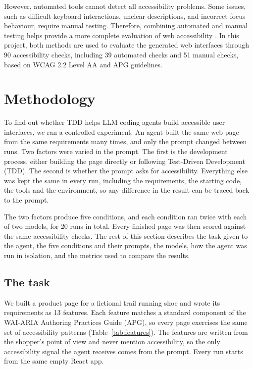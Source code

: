 \documentclass[conference]{IEEEtran}
\begin{document}
However, automated tools cannot detect all accessibility problems. Some issues, such as difficult keyboard interactions, unclear descriptions, and incorrect focus behaviour, require manual testing. Therefore, combining automated and manual testing helps provide a more complete evaluation of web accessibility \cite{playwright2026}. In this project, both methods are used to evaluate the generated web interfaces through 90 accessibility checks, including 39 automated checks and 51 manual checks, based on WCAG 2.2 Level AA and APG guidelines.

\section{Methodology}

To find out whether TDD helps LLM coding agents build accessible user interfaces, we ran a controlled experiment. An agent built the same web page from the same requirements many times, and only the prompt changed between runs. Two factors were varied in the prompt. The first is the development process, either building the page directly or following Test-Driven Development (TDD). The second is whether the prompt asks for accessibility. Everything else was kept the same in every run, including the requirements, the starting code, the tools and the environment, so any difference in the result can be traced back to the prompt.

The two factors produce five conditions, and each condition ran twice with each of two models, for 20 runs in total. Every finished page was then scored against the same accessibility checks. The rest of this section describes the task given to the agent, the five conditions and their prompts, the models, how the agent was run in isolation, and the metrics used to compare the results.

\subsection{The task}

We built a product page for a fictional trail running shoe and wrote its requirements as 13 features. Each feature matches a standard component of the WAI-ARIA Authoring Practices Guide (APG), so every page exercises the same set of accessibility patterns (Table~\ref{tab:features}). The features are written from the shopper's point of view and never mention accessibility, so the only accessibility signal the agent receives comes from the prompt. Every run starts from the same empty React app.
\end{document}
